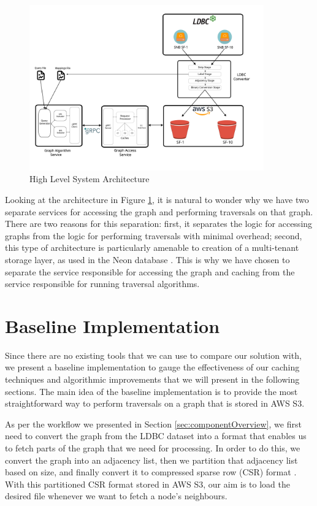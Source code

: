 \begin{figure}[ht]
    \centering
    \includegraphics[width=0.9\textwidth]{figures/architecture.png}
    \caption{High Level System Architecture}
    \label{fig:sysArch}
\end{figure}

Looking at the architecture in Figure \ref{fig:sysArch}, it is natural to wonder
why we have two separate services for accessing the graph and performing
traversals on that graph. There are two reasons for this separation: first, it
separates the logic for accessing graphs from the logic for performing
traversals with minimal overhead; second, this type of architecture is
particularly amenable to creation of a multi-tenant storage layer, as used
in the Neon database \cite{neonPostgres}. This is why we have chosen to separate
the service responsible for accessing the graph and caching from the service
responsible for running traversal algorithms.

\section{Baseline Implementation}\label{sec:baseline}
Since there are no existing tools that we can use to compare our solution with,
we present a baseline implementation to gauge the effectiveness of our caching
techniques and algorithmic improvements that we will present in the following
sections. The main idea of the baseline implementation is to provide the most
straightforward way to perform traversals on a graph that is stored in AWS S3.

\medskip
As per the workflow we presented in Section \ref{sec:componentOverview}, we
first need to convert the graph from the LDBC dataset into a format that
enables us to fetch parts of the graph that we need for processing. In order to
do this, we convert the graph into an adjacency list, then we partition that
adjacency list based on size, and finally convert it to compressed sparse
row (CSR) format \cite{duff1984computer}. With this partitioned CSR format stored
in AWS S3, our aim is to load the desired file whenever we want to fetch a node's
neighbours.

